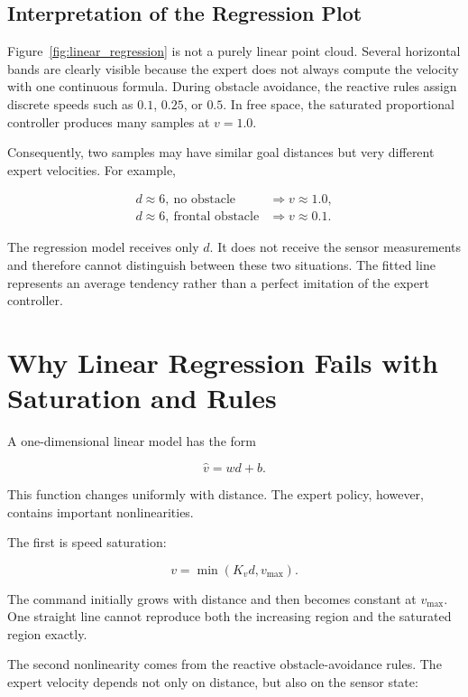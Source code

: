 \documentclass[10pt,twocolumn,a4paper]{article}
\begin{document}
\subsection{Interpretation of the Regression Plot}

Figure~\ref{fig:linear_regression} is not a purely linear point cloud. Several
horizontal bands are clearly visible because the expert does not always
compute the velocity with one continuous formula. During obstacle avoidance,
the reactive rules assign discrete speeds such as $0.1$, $0.25$, or $0.5$.
In free space, the saturated proportional controller produces many samples at
$v=1.0$.

Consequently, two samples may have similar goal distances but very different
expert velocities. For example,

\[
\begin{aligned}
    d\approx 6,\ \text{no obstacle}
    &\Rightarrow v\approx 1.0,\\
    d\approx 6,\ \text{frontal obstacle}
    &\Rightarrow v\approx 0.1.
\end{aligned}
\]

The regression model receives only $d$. It does not receive the sensor
measurements and therefore cannot distinguish between these two situations.
The fitted line represents an average tendency rather than a perfect
imitation of the expert controller.

\section{Why Linear Regression Fails with Saturation and Rules}

A one-dimensional linear model has the form

\[
    \hat{v}=wd+b.
\]

This function changes uniformly with distance. The expert policy, however,
contains important nonlinearities.

The first is speed saturation:

\begin{equation}
    v=\min(K_v d,v_{\max}).
    \label{eq:nonlinear_saturation}
\end{equation}

The command initially grows with distance and then becomes constant at
$v_{\max}$. One straight line cannot reproduce both the increasing region and
the saturated region exactly.

The second nonlinearity comes from the reactive obstacle-avoidance rules. The
expert velocity depends not only on distance, but also on the sensor state:
\end{document}
